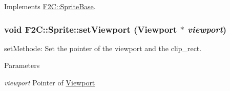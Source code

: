 Implements \hyperlink{class_f2_c_1_1_sprite_base_af9dfc70083ca5a774d3874b61a6f9abc}{F2C::SpriteBase}.\hypertarget{class_f2_c_1_1_sprite_a8bc4649a6100c8b26c67c94e79497289}{
\subsubsection[{setViewport}]{\setlength{\rightskip}{0pt plus 5cm}void F2C::Sprite::setViewport ({\bf Viewport} $\ast$ {\em viewport})}}
\label{class_f2_c_1_1_sprite_a8bc4649a6100c8b26c67c94e79497289}


setMethode: Set the pointer of the viewport and the clip\_\-rect. 
\begin{DoxyParams}{Parameters}
\item[{\em viewport}]Pointer of \hyperlink{class_f2_c_1_1_viewport}{Viewport} \end{DoxyParams}
